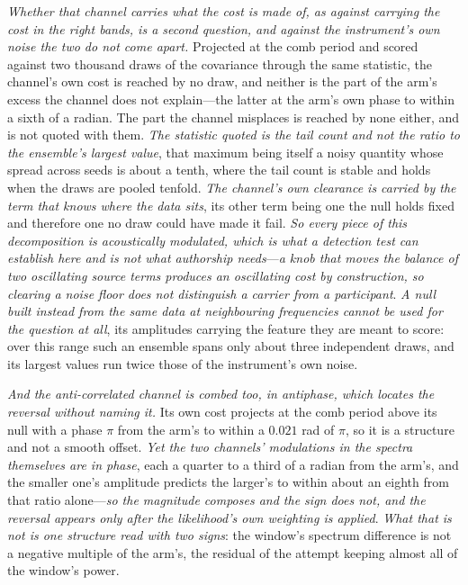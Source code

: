\documentclass[11pt,a4paper]{article}
\theoremstyle{plain}
\theoremstyle{definition}
\theoremstyle{remark}
\begin{document}
\emph{Whether that channel carries what the cost is made of, as against carrying the cost in the right bands, is
a second question, and against the instrument's own noise the two do not come apart.} Projected at the comb
period and scored against two thousand draws of the covariance through the same statistic, the channel's own
cost is reached by no draw, and neither is the part of the arm's excess the channel does not explain---the latter
at the arm's own phase to within a sixth of a radian. The part the channel misplaces is reached by none either,
and is not quoted with them. \emph{The statistic quoted is the tail count and not the ratio to the ensemble's
largest value}, that maximum being itself a noisy quantity whose spread across seeds is about a tenth, where the
tail count is stable and holds when the draws are pooled tenfold. \emph{The channel's
own clearance is carried by the term that knows where the data sits}, its other term being one the null holds
fixed and therefore one no draw could have made it fail. \emph{So every piece of this decomposition is
acoustically modulated, which is what a detection test can establish here and is not what authorship
needs}---\emph{a knob that moves the balance of two oscillating source terms produces an oscillating cost by
construction, so clearing a noise floor does not distinguish a carrier from a participant}. \emph{A null built
instead from the same data at neighbouring frequencies cannot be used for the question at all}, its amplitudes
carrying the feature they are meant to score: over this range such an ensemble spans only about three
independent draws, and its largest values run twice those of the instrument's own
noise.

\emph{And the anti-correlated channel is combed too, in antiphase, which locates the reversal without naming
it.} Its own cost projects at the comb period above its null with a phase $\pi$ from the arm's to within a
$0.021$ rad of $\pi$, so it is a structure and not a smooth offset. \emph{Yet the two channels' modulations in
the spectra themselves are in phase}, each a quarter to a third of a radian from the arm's, and the smaller
one's amplitude predicts the larger's to within about an eighth from that ratio alone---\emph{so the magnitude composes and the sign does
not, and the reversal appears only after the likelihood's own weighting is applied}. \emph{What that is not is
one structure read with two signs}: the window's spectrum difference is not a negative multiple of the arm's,
the residual of the attempt keeping almost all of the window's power.
\end{document}
